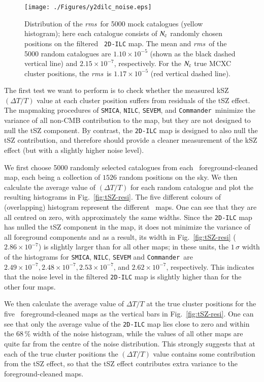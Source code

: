 \documentclass[traditabstract, longauth]{aa}
\newcommand{\commander}{{\tt Commander}}
\newcommand{\1}{\'\i }
\def \rms{{\it rms}}
\begin{document}
\begin{figure}
\centering
\texttt{[image: ./Figures/y2dilc\_noise.eps]}
\caption[fig:y2dilc-noise]{
Distribution of the \rms\ for 5000 mock catalogues
(yellow histogram); here each catalogue
consists of $N_{\rm c}$ randomly chosen positions on the filtered {\tt
2D-ILC} map. The mean and \rms\ of the 5000 random catalogues are $1.10
\times 10^{-5}$ (shown as the black
dashed vertical line) and $2.15 \times 10^{-7}$, respectively. For the $N_{\rm c}$ true MCXC
cluster positions, the \rms\ is $1.17 \times 10^{-5}$ (red vertical dashed line).}
\label{fig:y2dilc-noise}
\end{figure}

The first test we want to perform is to check whether the measured
kSZ $(\Delta T/T)$ value at each cluster position suffers from residuals of
the tSZ effect. The mapmaking procedures of {\tt SMICA}, {\tt NILC},
{\tt SEVEM}, and \commander\ minimize
the variance of all non-CMB contribution to the map, but they are not designed
to null the tSZ component. By contrast, the {\tt 2D-ILC} map is designed to
also null the tSZ contribution, and therefore should provide a cleaner
measurement of the kSZ effect (but with a slightly higher noise level).

We first choose 5000 randomly selected catalogues from each \Planck\
foreground-cleaned map, each being a collection of $1526$ random positions on
the sky. We then calculate the average value of $(\Delta T/T)$ for each random
catalogue and plot the resulting histograms in Fig.~\ref{fig:tSZ-resi}. The
five different colours of (overlapping) histogram represent the different \Planck\ maps.
One can see that they are all centred on zero, with approximately the same
widths. Since the {\tt 2D-ILC} map has nulled the tSZ component in the map, it
does not minimize the variance of all foreground components and as a result,
its width in Fig.~\ref{fig:tSZ-resi} ($2.86 \times 10^{-7}$) is slightly larger than for
all other maps; in these units, the $1\,\sigma$ width of the histograms for {\tt SMICA}, {\tt NILC},
{\tt SEVEM} and \commander\ are $2.49\times 10^{-7},2.48\times 10^{-7},2.53\times 10^{-7}$, and $2.62\times 10^{-7}$, respectively. This
indicates that the noise level in the filtered {\tt 2D-ILC} map is slightly
higher than for the other four maps.

We then calculate the average value of $\Delta T/T$ at the true cluster
positions for the five \Planck\ foreground-cleaned maps as the vertical bars in Fig.~\ref{fig:tSZ-resi}. One can see that
only the average value of the {\tt 2D-ILC}
map lies close to zero and within the 68\,\% width of the noise histogram,
while the values of all other maps are quite far from the centre of the
noise distribution. This strongly suggests
that at each of the true cluster positions the $(\Delta T/T)$ value contains
some contribution from the tSZ effect, so that the tSZ effect contributes
extra variance to the foreground-cleaned maps.
\end{document}
